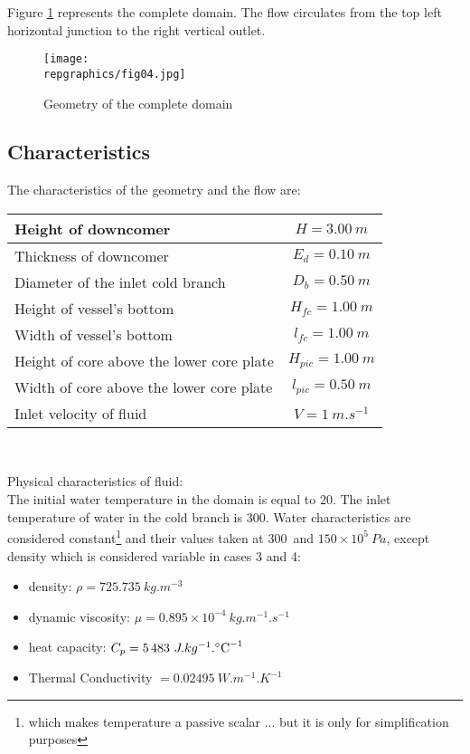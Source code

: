 Figure \ref{figante21} represents the complete domain. The flow circulates from
the top left horizontal junction to the right vertical outlet. 

\begin{figure}[h!]
\begin{center}
\texttt{[image: \\repgraphics/fig04.jpg]} 
\caption{Geometry of the complete domain}
\label{figante21}
\end{center}
\end{figure}


	\subsection{Characteristics}

The characteristics of the geometry and the flow are:
\begin{center}
\begin{tabular}{|l|c|}
\hline
Height of downcomer & $H = 3.00\ m$ \\
\hline 
Thickness of downcomer & $E_{d} = 0.10\ m$ \\ 
\hline 
Diameter of the inlet cold branch & $D_{b} = 0.50\ m$ \\ 
\hline 
Height of vessel's bottom & $H_{fc} = 1.00\ m$ \\ 
\hline 
Width of vessel's bottom & $l_{fc} = 1.00\ m$ \\ 
\hline 
Height of core above the lower core plate & $H_{pic} = 1.00\ m$ \\ 
\hline 
Width of core above the lower core plate & $l_{pic} = 0.50\ m$ \\ 
\hline 
Inlet velocity of fluid & $V = 1\ m.s^{-1}$ \\ 
\hline 
\end{tabular}\\
\end{center}

Physical characteristics of fluid:\\
The initial water temperature in the domain is equal to 20\degresC.
The inlet temperature of water in the cold branch is 300\degresC.
Water characteristics are considered constant\footnote{which makes temperature a
passive scalar ... but it is only for simplification purposes} and their values taken at
300\degresC\ and $150\times 10^{5}\ Pa$, except density which is considered
variable in cases 3 and 4: 
\begin{itemize}
	\item density: $\rho = 725.735\ kg.m^{-3}$ 
	\item dynamic viscosity: $\mu = 0.895\times10^{-4}\ kg.m^{-1}.s^{-1}$
	\item heat capacity: $C_{p} = 5\,483\ J.kg^{-1}.\mbox{\degresC}^{-1}$ 
	\item Thermal Conductivity $ = 0.02495\ W.m^{-1}.K^{-1}$
\end{itemize}



